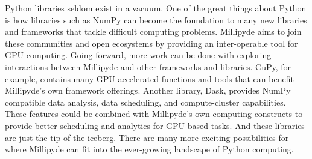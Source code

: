 Python libraries seldom exist in a vacuum. One of the great things about Python is how libraries such as NumPy can become the foundation to many new libraries and frameworks that tackle difficult computing problems. Millipyde aims to join these communities and open ecosystems by providing an inter-operable tool for GPU computing. Going forward, more work can be done with exploring interactions between Millipyde and other frameworks and libraries. CuPy, for example, contains many GPU-accelerated functions and tools that can benefit Millipyde's own framework offerings. Another library, Dask, provides NumPy compatible data analysis, data scheduling, and compute-cluster capabilities. These features could be combined with Millipyde's own computing constructs to provide better scheduling and analytics for GPU-based tasks. And these libraries are just the tip of the iceberg. There are many more exciting possibilities for where Millipyde can fit into the ever-growing landscape of Python computing.